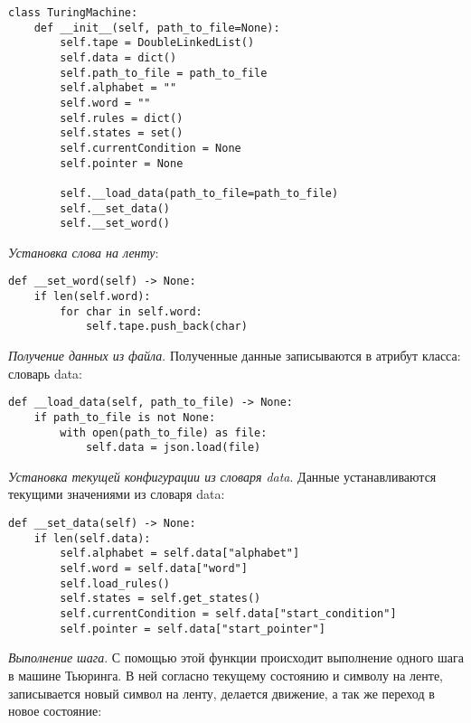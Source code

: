 \begin{lstlisting}
class TuringMachine:
    def __init__(self, path_to_file=None):
        self.tape = DoubleLinkedList()
        self.data = dict()
        self.path_to_file = path_to_file
        self.alphabet = ""
        self.word = ""
        self.rules = dict()
        self.states = set()
        self.currentCondition = None
        self.pointer = None

        self.__load_data(path_to_file=path_to_file)
        self.__set_data()
        self.__set_word()
\end{lstlisting}

\textit{Установка слова на ленту}:

\begin{lstlisting}
def __set_word(self) -> None:
    if len(self.word):
        for char in self.word:
            self.tape.push_back(char)
\end{lstlisting}

\textit{Получение данных из файла}. Полученные данные записываются в атрибут класса: словарь data:

\begin{lstlisting}
def __load_data(self, path_to_file) -> None:
    if path_to_file is not None:
        with open(path_to_file) as file:
            self.data = json.load(file)
\end{lstlisting}


\textit{Установка текущей конфигурации из словаря data}. Данные устанавливаются текущими значениями из словаря data:

\begin{lstlisting}
def __set_data(self) -> None:
    if len(self.data):
        self.alphabet = self.data["alphabet"]
        self.word = self.data["word"]
        self.load_rules()
        self.states = self.get_states()
        self.currentCondition = self.data["start_condition"]
        self.pointer = self.data["start_pointer"]
\end{lstlisting}


\textit{Выполнение шага}. С помощью этой функции происходит выполнение одного шага в машине Тьюринга.
В ней согласно текущему состоянию и символу на ленте, записывается новый символ на ленту, делается движение, а так же переход в новое состояние:

